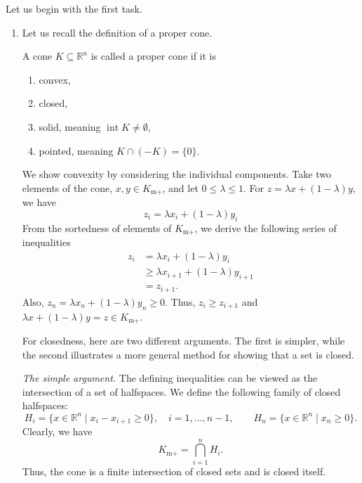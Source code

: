 Let us begin with the first task.

\begin{enumerate}
    \item[(a)]
Let us recall the definition of a proper cone.
\begin{Def}
    A cone $K \subseteq \mathbb{R}^n$ is called a proper cone if it is
    \begin{enumerate}[label=(\roman*)]
        \item convex,
        \item closed,
        \item solid, meaning $\operatorname{int} K \neq \emptyset$,
        \item pointed, meaning $K \cap (-K) = \{0\}$.
    \end{enumerate}
\end{Def}

We show convexity by considering the individual components.
Take two elements of the cone, $x, y \in K_{\text{m}+}$, and let $0 \leq \lambda \leq 1$.
For $z = \lambda x + (1 - \lambda)y$, we have
\[
    z_i = \lambda x_i + (1 - \lambda) y_i
\]
From the sortedness of elements of $K_{\text{m}+}$, we derive the following series of inequalities
\begin{align*}
    z_i &= \lambda x_i + (1 - \lambda) y_i \\
        &\geq \lambda x_{i+1} + (1 - \lambda) y_{i + 1}\\
        &= z_{i + 1}.
\end{align*}
Also, $z_n = \lambda x_n + (1-\lambda)y_n \geq 0$.
Thus, $z_i \geq z_{i+1}$ and $\lambda x + (1-\lambda)y = z \in K_{\text{m}+}$.

For closedness, here are two different arguments.
The first is simpler, while the second illustrates a more general method for showing that a set is closed.

\textit{The simple argument.} The defining inequalities can be viewed as the intersection of a set of halfspaces.
We define the following family of closed halfspaces:
\[
    H_i = \{x \in \mathbb{R}^n \mid x_i - x_{i + 1} \geq 0\},
    \quad i = 1,\dots,n-1,
    \qquad
    H_n = \{x \in \mathbb{R}^n \mid x_n \geq 0\}.
\]
Clearly, we have
\[
    K_{\text{m}+} = \bigcap_{i = 1}^n H_i.
\]
Thus, the cone is a finite intersection of closed sets and is closed itself.


\end{enumerate}
